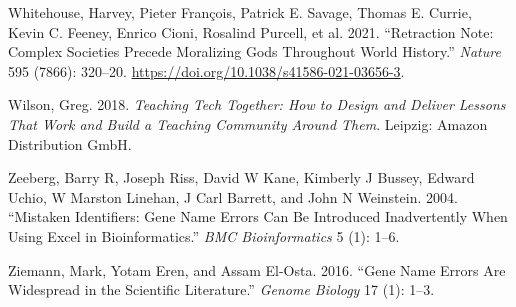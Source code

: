 \documentclass{article}
\newlength{\cslhangindent}
\newenvironment{CSLReferences}[2] %
 {%
  \setlength{\parindent}{0pt}
  \ifodd #1 \everypar{\setlength{\hangindent}{\cslhangindent}}\ignorespaces\fi
  \ifnum #2 > 0
  \setlength{\parskip}{#2\baselineskip}
  \fi
 }%
 {}
\begin{document}
\begin{CSLReferences}{1}{0}
\leavevmode{}%
Whitehouse, Harvey, Pieter François, Patrick E. Savage, Thomas E.
Currie, Kevin C. Feeney, Enrico Cioni, Rosalind Purcell, et al. 2021.
{``Retraction {Note}: {Complex} Societies Precede Moralizing Gods
Throughout World History.''} \emph{Nature} 595 (7866): 320--20.
\url{https://doi.org/10.1038/s41586-021-03656-3}.

\leavevmode{}%
Wilson, Greg. 2018. \emph{Teaching Tech Together: How to Design and
Deliver Lessons That Work and Build a Teaching Community Around Them}.
{Leipzig}: {Amazon Distribution GmbH}.

\leavevmode{}%
Zeeberg, Barry R, Joseph Riss, David W Kane, Kimberly J Bussey, Edward
Uchio, W Marston Linehan, J Carl Barrett, and John N Weinstein. 2004.
{``Mistaken Identifiers: Gene Name Errors Can Be Introduced
Inadvertently When Using Excel in Bioinformatics.''} \emph{BMC
Bioinformatics} 5 (1): 1--6.

\leavevmode{}%
Ziemann, Mark, Yotam Eren, and Assam El-Osta. 2016. {``Gene Name Errors
Are Widespread in the Scientific Literature.''} \emph{Genome Biology} 17
(1): 1--3.

\end{CSLReferences}



\end{document}

